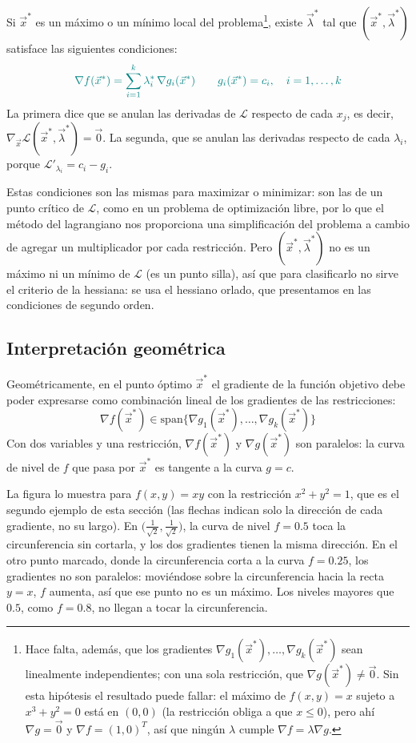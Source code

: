 \documentclass{article}
\newcommand{\vect}[1]{\vec{#1}}
\begin{document}
Si \(\vect{x}^*\) es un máximo o un mínimo local del problema\footnote{Hace falta, además, que los gradientes \(\nabla g_1(\vect{x}^*),\dots,\nabla g_k(\vect{x}^*)\) sean linealmente independientes; con una sola restricción, que \(\nabla g(\vect{x}^*)\neq\vect{0}\). Sin esta hipótesis el resultado puede fallar: el máximo de \(f(x,y)=x\) sujeto a \(x^3+y^2=0\) está en \((0,0)\) (la restricción obliga a que \(x\le0\)), pero ahí \(\nabla g=\vect{0}\) y \(\nabla f=(1,0)^T\), así que ningún \(\lambda\) cumple \(\nabla f=\lambda\nabla g\).}, existe \(\vect{\lambda}^*\) tal que \((\vect{x}^*,\vect{\lambda}^*)\) satisface las siguientes condiciones:
\[\color{teal}
\nabla f(\vect{x}^*)=\sum_{i=1}^k\lambda_i^*\,\nabla g_i(\vect{x}^*)
\qquad
g_i(\vect{x}^*)=c_i,\quad i=1,\dots,k
\]
La primera dice que se anulan las derivadas de \(\mathcal{L}\) respecto de cada \(x_j\), es decir, \(\nabla_{\vect{x}}\mathcal{L}(\vect{x}^*,\vect{\lambda}^*)=\vect{0}\). La segunda, que se anulan las derivadas respecto de cada \(\lambda_i\), porque \(\mathcal{L}'_{\lambda_i}=c_i-g_i\).

Estas condiciones son las mismas para maximizar o minimizar: son las de un punto crítico de \(\mathcal{L}\), como en un problema de optimización libre, por lo que el método del lagrangiano nos proporciona una simplificación del problema a cambio de agregar un multiplicador por cada restricción. Pero \((\vect{x}^*,\vect{\lambda}^*)\) no es un máximo ni un mínimo de \(\mathcal{L}\) (es un punto silla), así que para clasificarlo no sirve el criterio de la hessiana: se usa el hessiano orlado, que presentamos en las condiciones de segundo orden.

\subsection*{Interpretación geométrica}

Geométricamente, en el punto óptimo \(\vect{x}^*\) el gradiente de la función objetivo debe poder expresarse como combinación lineal de los gradientes de las restricciones:
\[
\nabla f(\vect{x}^*)\in\mathrm{span}\{\nabla g_1(\vect{x}^*),\dots,\nabla g_k(\vect{x}^*)\}
\]
Con dos variables y una restricción, \(\nabla f(\vect{x}^*)\) y \(\nabla g(\vect{x}^*)\) son paralelos: la curva de nivel de \(f\) que pasa por \(\vect{x}^*\) es tangente a la curva \(g=c\).

La figura lo muestra para \(f(x,y)=xy\) con la restricción \(x^2+y^2=1\), que es el segundo ejemplo de esta sección (las flechas indican solo la dirección de cada gradiente, no su largo). En \(\bigl(\tfrac1{\sqrt2},\tfrac1{\sqrt2}\bigr)\), la curva de nivel \(f=0.5\) toca la circunferencia sin cortarla, y los dos gradientes tienen la misma dirección. En el otro punto marcado, donde la circunferencia corta a la curva \(f=0.25\), los gradientes no son paralelos: moviéndose sobre la circunferencia hacia la recta \(y=x\), \(f\) aumenta, así que ese punto no es un máximo. Los niveles mayores que \(0.5\), como \(f=0.8\), no llegan a tocar la circunferencia.
\end{document}
